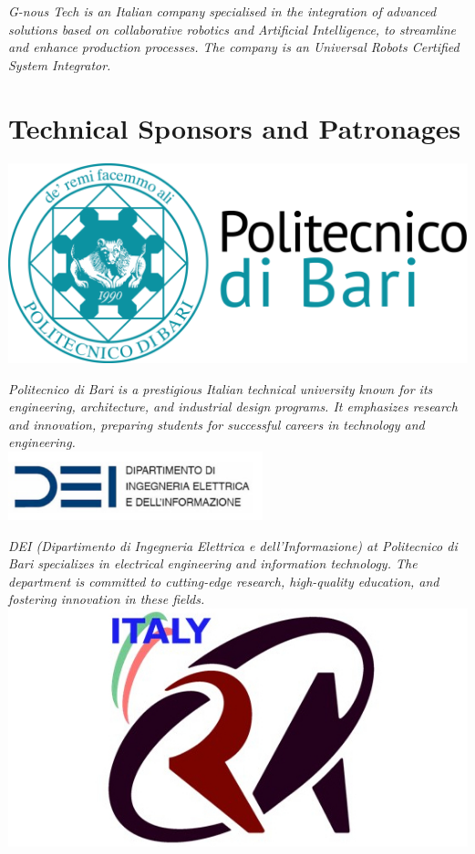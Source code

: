 \documentclass[
	openany, %
	parskip=full, %
	12pt, %
	a4paper, %
]{conferencebooklet} %
\begin{document}
\begin{multicols*}{2}
    \textit{G-nous Tech is an Italian company specialised in the integration of advanced solutions based on collaborative robotics and Artificial Intelligence, to streamline and enhance production processes. The company is an Universal Robots Certified System Integrator.} \\

    \section{Technical Sponsors and Patronages}

    \hfill\includegraphics[width=\sponsorscaling\linewidth]{logos/poliba.png}\hspace*{\fill}

    \textit{Politecnico di Bari is a prestigious Italian technical university known for its engineering, architecture, and industrial design programs. It emphasizes research and innovation, preparing students for successful careers in technology and engineering.} \\
    
    \hfill\includegraphics[width=\sponsorscaling\linewidth]{logos/dei.png}\hspace*{\fill}

    \textit{DEI (Dipartimento di Ingegneria Elettrica e dell'Informazione) at Politecnico di Bari specializes in electrical engineering and information technology. The department is committed to cutting-edge research, high-quality education, and fostering innovation in these fields.} \\
        
    \hfill\includegraphics[width=\sponsorscaling\linewidth]{logos/ras-italy.jpeg}\hspace*{\fill}


\end{multicols*}
\end{document}
